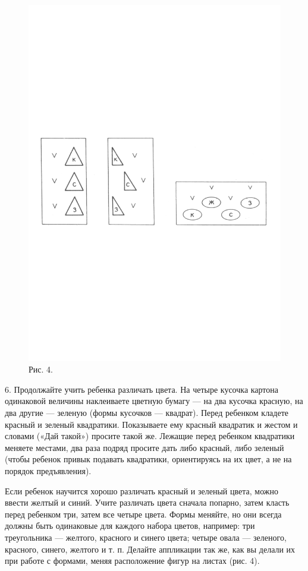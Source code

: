 \documentclass[a5paper]{book}
\begin{document}
\begin{figure}
\centering
\includegraphics[width=\linewidth]{media/media/image4.png} Рис. 4.
\end{figure}

6. Продолжайте учить ребенка различать цвета. На четыре кусочка картона
одинаковой величины наклеиваете цветную бумагу --- на два кусочка
красную, на два другие --- зеленую (формы кусочков --- квадрат). Перед
ребенком кладете красный и зеленый квадратики. Показываете ему красный
квадратик и жестом и словами («Дай такой») просите такой же. Лежащие
перед ребенком квадратики меняете местами, два раза подряд просите дать
либо красный, либо зеленый (чтобы ребенок привык подавать квадратики,
ориентируясь на их цвет, а не на порядок предъявления).

Если ребенок научится хорошо различать красный и зеленый цвета, можно
ввести желтый и синий. Учите различать цвета сначала попарно, затем
класть перед ребенком три, затем все четыре цвета. Формы меняйте, но они
всегда должны быть одинаковые для каждого набора цветов, например: три
треугольника --- желтого, красного и синего цвета; четыре овала ---
зеленого, красного, синего, желтого и т. п. Делайте аппликации так же,
как вы делали их при работе с формами, меняя расположение фигур на
листах (рис. 4).
\end{document}
